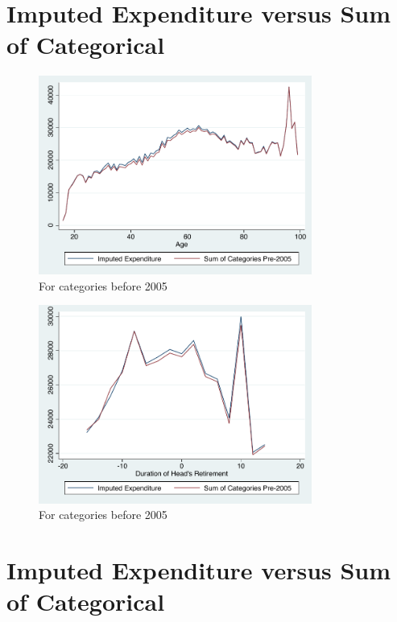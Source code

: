 \documentclass[11pt]{article}
\begin{document}
\clearpage

\section{Imputed Expenditure versus Sum of Categorical}

\begin{figure}[h]
	\caption{For categories before 2005}
	\centering
	\includegraphics[width=0.8\textwidth]{../ConsumptionPostRetirement/Comparision_of_imputed_and_categorical_age.pdf}
\end{figure}

\begin{figure}[h]
	\caption{For categories before 2005}
	\centering
	\includegraphics[width=0.8\textwidth]{../ConsumptionPostRetirement/Comparision_of_imputed_and_categorical_ret.pdf}
\end{figure}


\section{Imputed Expenditure versus Sum of Categorical}
\end{document}
